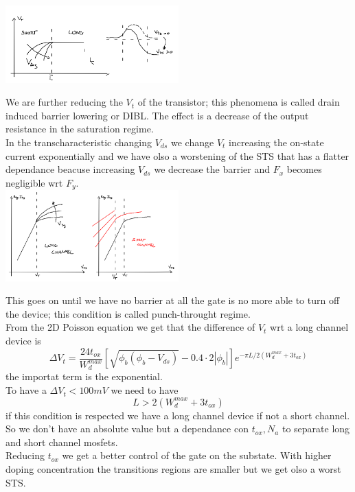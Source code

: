 \centering
\includegraphics[width=0.5\textwidth]{dibl.png}\\
\raggedright

We are further reducing the $V_t$ of the transistor; this phenomena is called drain induced barrier lowering or DIBL. The effect is a decrease of the output resistance in the saturation regime.\\
In the transcharacteristic changing $V_{ds}$ we change $V_t$ increasing the on-state current exponentially and we have olso a worstening of the STS that has a flatter dependance beacuse increasing $V_{ds}$ we decrease the barrier and $F_x$ becomes negligible wrt $F_y$.\\

\centering
\includegraphics[width=0.5\textwidth]{shorttc.png}\\
\raggedright

This goes on until we have no barrier at all the gate is no more able to turn off the device; this condition is called punch-throught regime.\\
\vspace{5mm}
From the 2D Poisson equation we get that the difference of $V_t$ wrt a long channel device is 
\begin{equation}
\Delta V_t= \frac{24t_{ox}}{W_d^{max}}[\sqrt{\phi_b(\phi_b-V_{ds})}-0.4\cdot 2|\phi_b|]e^{-\pi L/2(W_d^{max}+3t_{ox})}
\end{equation} 
the importat term is the exponential.\\
To have a $\Delta V_t<100mV$ we need to have 
\begin{equation}
L>2(W_d^{max}+3t_{ox})
\end{equation}
if this condition is respected we have a long channel device if not a short channel. So we don't have an absolute value but a dependance con $t_{ox},N_a$ to separate long and short channel mosfets.\\
Reducing $t_{ox}$ we get a better control of the gate on the substate. With higher doping concentration the transitions regions are smaller but we get olso a worst STS.\\

